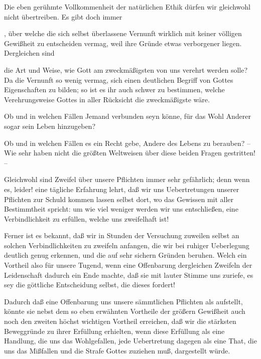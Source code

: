 Die eben gerühmte Vollkommenheit der natürlichen Ethik dürfen wir gleichwohl nicht übertreiben. Es gibt doch immer
\begin{aufza}
\item {}, über welche die sich selbst überlassene Vernunft wirklich mit keiner völligen Gewißheit zu entscheiden vermag, weil ihre Gründe etwas verborgener liegen. Dergleichen sind \zB\
\begin{aufzb}
\item die Art und Weise, wie Gott am zweckmäßigsten von uns verehrt werden solle? Da die Vernunft so wenig vermag, sich einen deutlichen Begriff von Gottes Eigenschaften zu bilden; so ist es ihr auch schwer zu bestimmen, welche Verehrungsweise Gottes in aller Rücksicht die zweckmäßigste wäre.
\item Ob und in welchen Fällen Jemand verbunden seyn könne, für das Wohl Anderer sogar sein Leben hinzugeben?
\item Ob und in welchen Fällen es ein Recht gebe, Andere des Lebens zu berauben? -- Wie sehr haben nicht die größten Weltweisen über diese beiden Fragen gestritten! --
\end{aufzb}\par
Gleichwohl sind Zweifel über unsere Pflichten immer sehr gefährlich; denn wenn es, leider! eine tägliche Erfahrung lehrt, daß wir uns Uebertretungen unserer Pflichten zur Schuld kommen lassen selbst dort, wo das Gewissen mit aller Bestimmtheit spricht: um wie viel weniger werden wir uns entschließen, eine Verbindlichkeit zu erfüllen, welche uns zweifelhaft ist!
\item Ferner ist es bekannt, daß wir in Stunden der Versuchung zuweilen selbst an solchen Verbindlichkeiten zu zweifeln anfangen, die wir bei ruhiger Ueberlegung deutlich genug erkennen, und die auf sehr sichern Gründen beruhen. Welch ein Vortheil also für unsere Tugend, wenn eine Offenbarung dergleichen Zweifeln der Leidenschaft dadurch ein Ende machte, daß sie mit lauter Stimme uns zuriefe, es sey die göttliche Entscheidung selbst, die dieses fordert!~
\item Dadurch daß eine Offenbarung uns unsere sämmtlichen Pflichten als \RWbet{Gebote Gottes} aufstellt, könnte sie nebst dem so eben erwähnten Vortheile der größern Gewißheit auch noch den zweiten höchst wichtigen Vortheil erreichen, daß wir die stärksten Beweggründe zu ihrer Erfüllung erhielten, wenn diese Erfüllung als eine Handlung, die uns das Wohlgefallen, jede Uebertretung dagegen als eine That, die uns das Mißfallen und die Strafe Gottes zuziehen muß, dargestellt würde.

\end{aufza}
